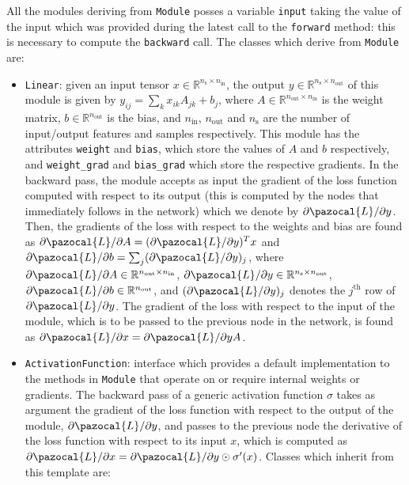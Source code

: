 \documentclass[10pt,final,a4paper]{article}
\newcommand{\Lb}{\pazocal{L}}
\begin{document}
All the modules deriving from \verb|Module| posses a variable \verb|input| taking the value of the input which was provided during the latest call to the \verb|forward| method: this is necessary to compute  the \verb|backward| call.
The classes which derive from \verb|Module| are:
\begin{itemize}
\item \verb|Linear|: given an input tensor $x \in \mathbb{R}^{n_\text{s} \times n_\text{in}}$, the output $y \in \mathbb{R}^{n_\text{s} \times n_\text{out}}$ of this module is given by $y_{ij} = \sum_{k} x_{ik} A_{jk} + b_{j}$, where $A \in \mathbb{R}^{n_\text{out} \times n_\text{in}}$ is the weight matrix, $b \in \mathbb{R}^{n_\text{out}}$ is the bias, and $n_\text{in}$, $n_\text{out}$ and $n_\text{s}$ are the number of input/output features and samples respectively. This module has the attributes \verb|weight| and \verb|bias|, which store the values of $A$ and $b$ respectively, and \verb|weight_grad| and \verb|bias_grad| which store the respective gradients. In the backward pass, the module accepts as input the gradient of the loss function computed with respect to its output (this is computed by the nodes that immediately follows in the network) which we denote by $\partial \Lb/\partial y$. Then, the gradients of the loss with respect to the weights and bias are found as $\partial \Lb/\partial A = (\partial \Lb/\partial y)^T x$ and $\partial \Lb/ \partial b = \sum_{j} (\partial \Lb/\partial y)_j$, where $\partial \Lb/\partial A \in \mathbb{R}^{n_\text{out} \times n_\text{in}}$, $\partial \Lb/\partial y \in \mathbb{R}^{n_\text{s} \times n_\text{out}}$, $\partial \Lb/ \partial b \in  \mathbb{R}^{n_\text{out}}$, and  $(\partial \Lb/\partial y)_j$ denotes the $j^{\text{th}}$ row of $\partial \Lb/\partial y$. The gradient of the loss with respect to the input of the module, which is to be passed to the previous node in the network, is found as $\partial \Lb / \partial x = \partial \Lb/\partial y A$.
\item \verb|ActivationFunction|: interface which provides a default implementation to the methods in  \verb|Module| that operate on or require internal weights or gradients. The backward pass of a generic activation function $\sigma$ takes as argument the gradient of the loss function with respect to the output of the module, $\partial \Lb/\partial y$, and passes to the previous node the derivative of the loss function with respect to its input $x$, which is computed as $\partial \Lb/\partial x = \partial \Lb/\partial y \odot \sigma'(x)$. Classes which inherit from this template are:

\end{itemize}
\end{document}
